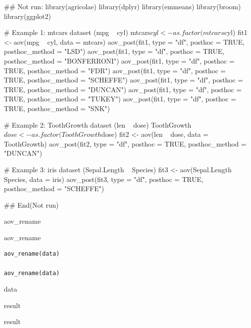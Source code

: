\documentclass[a4paper]{book}
\begin{document}
\begin{Examples}
\begin{ExampleCode}
\#\# Not run: 
library(agricolae)
library(dplyr)
library(emmeans)
library(broom)
library(ggplot2)

# Example 1: mtcars dataset (mpg ~ cyl)
mtcars$cyl <- as.factor(mtcars$cyl)
fit1 <- aov(mpg ~ cyl, data = mtcars)
aov_post(fit1, type = "df", posthoc = TRUE, posthoc_method = "LSD")
aov_post(fit1, type = "df", posthoc = TRUE, posthoc_method = "BONFERRONI")
aov_post(fit1, type = "df", posthoc = TRUE, posthoc_method = "FDR")
aov_post(fit1, type = "df", posthoc = TRUE, posthoc_method = "SCHEFFE")
aov_post(fit1, type = "df", posthoc = TRUE, posthoc_method = "DUNCAN")
aov_post(fit1, type = "df", posthoc = TRUE, posthoc_method = "TUKEY")
aov_post(fit1, type = "df", posthoc = TRUE, posthoc_method = "SNK")

# Example 2: ToothGrowth dataset (len ~ dose)
ToothGrowth$dose <- as.factor(ToothGrowth$dose)
fit2 <- aov(len ~ dose, data = ToothGrowth)
aov_post(fit2, type = "df", posthoc = TRUE, posthoc_method = "DUNCAN")

# Example 3: iris dataset (Sepal.Length ~ Species)
fit3 <- aov(Sepal.Length ~ Species, data = iris)
aov_post(fit3, type = "df", posthoc = TRUE, posthoc_method = "SCHEFFE")

## End(Not run)
\end{ExampleCode}
\end{Examples}

%
\begin{Description}
aov\_rename

aov\_rename
\end{Description}
%
\begin{Usage}
\begin{verbatim}
aov_rename(data)

aov_rename(data)
\end{verbatim}
\end{Usage}
%
\begin{Arguments}
\begin{ldescription}
\item[\code{data}] data
\end{ldescription}
\end{Arguments}
%
\begin{Value}
result

result
\end{Value}
\end{document}
